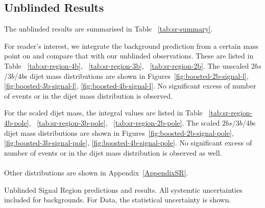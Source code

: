 \subsection{Unblinded Results}
The unblinded results are summarised in Table ~\ref{tab:sr-summary}. 

For reader's interest, we integrate the background prediction from a certain mass point on and compare that with our unblinded observations. These are listed in Table ~\ref{tab:sr-region-4b}, ~\ref{tab:sr-region-3b}, ~\ref{tab:sr-region-2b}. The unscaled $2bs$/$3b$/$4b$s dijet mass distributions are shown in Figures~\ref{fig:boosted-2b-signal-l}, \ref{fig:boosted-3b-signal-l}, \ref{fig:boosted-4b-signal-l}. No significant excess of number of events or in the dijet mass distribution is observed.

For the scaled dijet mass, the integral values are listed in Table ~\ref{tab:sr-region-4b-pole}, ~\ref{tab:sr-region-3b-pole}, ~\ref{tab:sr-region-2b-pole}. The scaled $2bs$/$3b$/$4b$s dijet mass distributions are shown in Figures~\ref{fig:boosted-2b-signal-pole}, \ref{fig:boosted-3b-signal-pole}, \ref{fig:boosted-4b-signal-pole}. No significant excess of number of events or in the dijet mass distribution is observed as well.


\paragraph{}
Other distributions are shown in Appendix~\ref{AppendixSR}.

\begin{table}[htbp!]
\scriptsize
\begin{center}

\caption{Unblinded Signal Region predictions and results. All systemtic uncertainties included for backgrounds. For Data, the statistical uncertainty is shown.}
\label{tab:sr-summary}
\end{center}
\end{table}

